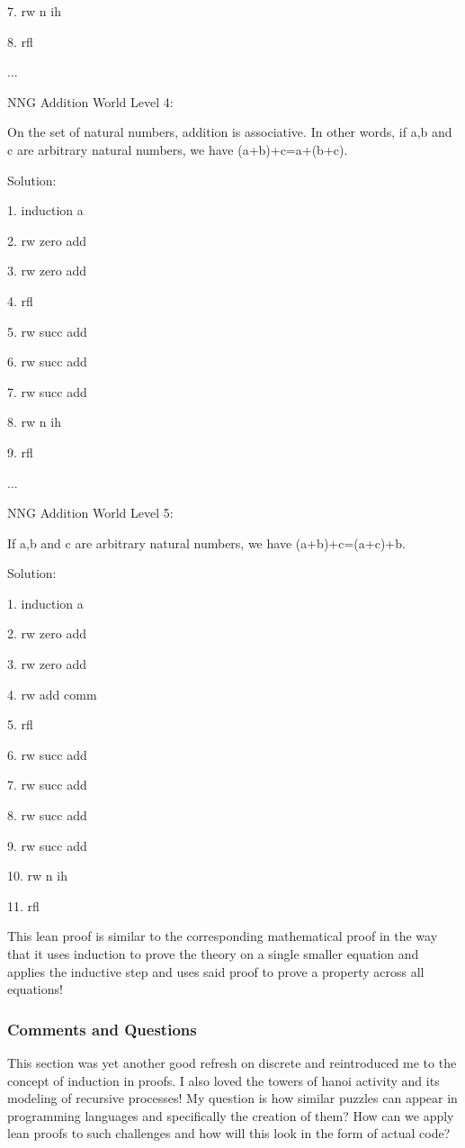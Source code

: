 \documentclass{article}
\theoremstyle{theorem}
\theoremstyle{definition}
\theoremstyle{remark}
\begin{document}
7. rw n ih

8. rfl

...

NNG Addition World Level 4:

On the set of natural numbers, addition is associative. In other words, if a,b and c are arbitrary natural numbers, we have (a+b)+c=a+(b+c).

Solution: 

1. induction a

2. rw zero add

3. rw zero add

4. rfl

5. rw succ add

6. rw succ add

7. rw succ add

8. rw n ih

9. rfl

...

NNG Addition World Level 5:

If a,b and c are arbitrary natural numbers, we have (a+b)+c=(a+c)+b.

Solution: 

1. induction a

2. rw zero add

3. rw zero add

4. rw add comm

5. rfl

6. rw succ add

7. rw succ add

8. rw succ add

9. rw succ add

10. rw n ih

11. rfl

This lean proof is similar to the corresponding mathematical proof in the way that it uses induction to prove the theory on a single smaller equation and applies the inductive step and uses said proof to prove a property across all equations!

\subsubsection*{Comments and Questions}

This section was yet another good refresh on discrete and reintroduced me to the concept of induction in proofs. I also loved the towers of hanoi activity and its modeling of recursive processes! My question is how similar puzzles can appear in programming languages and specifically the creation of them? How can we apply lean proofs to such challenges and how will this look in the form of actual code?
\end{document}
